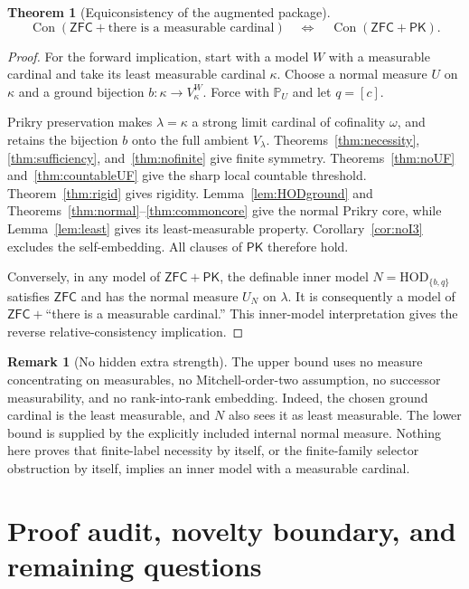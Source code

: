 \documentclass[11pt,letterpaper]{article}
\theoremstyle{definition}
\newtheorem{theorem}[definition]{Theorem}
\newtheorem{remark}[definition]{Remark}
\numberwithin{equation}{section}
\newcommand{\ZFC}{\mathsf{ZFC}}
\newcommand{\HOD}{\mathrm{HOD}}
\newcommand{\Con}{\operatorname{Con}}
\newcommand{\PK}{\mathsf{PK}}
\begin{document}
\begin{theorem}[Equiconsistency of the augmented package]\label{thm:equiconsistency}
\[
 \Con(\ZFC+\text{there is a measurable cardinal})
 \quad\Longleftrightarrow\quad
 \Con(\ZFC+\PK).
\]
\end{theorem}
\begin{proof}
For the forward implication, start with a model $W$ with a measurable cardinal and take its least measurable cardinal $\kappa$. Choose a normal measure $U$ on $\kappa$ and a ground bijection $b:\kappa\to V_\kappa^W$. Force with $\mathbb P_U$ and let $q=[c]$.

Prikry preservation makes $\lambda=\kappa$ a strong limit cardinal of cofinality $\omega$, and retains the bijection $b$ onto the full ambient $V_\lambda$. Theorems~\ref{thm:necessity}, \ref{thm:sufficiency}, and~\ref{thm:nofinite} give finite symmetry. Theorems~\ref{thm:noUF} and~\ref{thm:countableUF} give the sharp local countable threshold. Theorem~\ref{thm:rigid} gives rigidity. Lemma~\ref{lem:HODground} and Theorems~\ref{thm:normal}--\ref{thm:commoncore} give the normal Prikry core, while Lemma~\ref{lem:least} gives its least-measurable property. Corollary~\ref{cor:noI3} excludes the self-embedding. All clauses of $\PK$ therefore hold.

Conversely, in any model of $\ZFC+\PK$, the definable inner model $N=\HOD_{\{b,q\}}$ satisfies $\ZFC$ and has the normal measure $U_N$ on $\lambda$. It is consequently a model of $\ZFC+$``there is a measurable cardinal.'' This inner-model interpretation gives the reverse relative-consistency implication.
\end{proof}

\begin{remark}[No hidden extra strength]
The upper bound uses no measure concentrating on measurables, no Mitchell-order-two assumption, no successor measurability, and no rank-into-rank embedding. Indeed, the chosen ground cardinal is the least measurable, and $N$ also sees it as least measurable. The lower bound is supplied by the explicitly included internal normal measure. Nothing here proves that finite-label necessity by itself, or the finite-family selector obstruction by itself, implies an inner model with a measurable cardinal.
\end{remark}

\section{Proof audit, novelty boundary, and remaining questions}\label{sec:audit}
\end{document}

